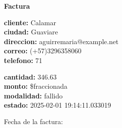 \documentclass{article}
\begin{document}
\begin{center}
    {\LARGE \textbf{Factura}}\\[1cm]
\end{center}

\textbf{cliente:} Calamar \\
\textbf{ciudad:} Guaviare \\
\textbf{direccion:} aguirremaria@example.net \\
\textbf{correo:} (+57)3296358060 \\
\textbf{telefono:} 71 \\

\vspace{0.5cm}

\textbf{cantidad:} 346.63 \\
\textbf{monto:} \$fraccionada \\
\textbf{modalidad:} fallido \\
\textbf{estado:} 2025-02-01 19:14:11.033019 \\

\vspace{1cm}

Fecha de la factura: 
\end{document}
